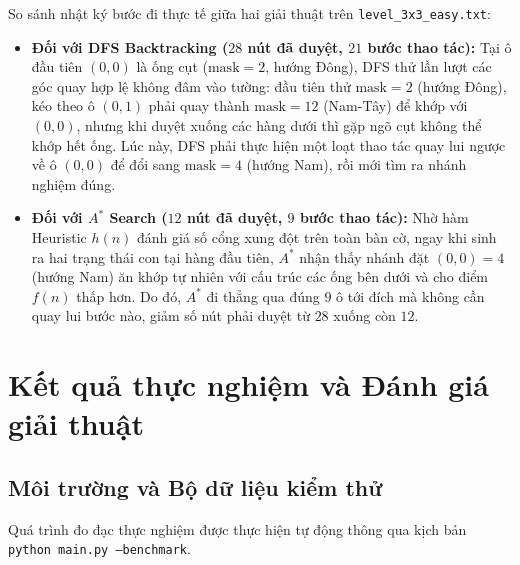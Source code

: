 \documentclass[a4paper]{article}
\begin{document}
So sánh nhật ký bước đi thực tế giữa hai giải thuật trên \texttt{level\_3x3\_easy.txt}:
\begin{itemize}
    \item \textbf{Đối với DFS Backtracking ($28$ nút đã duyệt, $21$ bước thao tác):}
    Tại ô đầu tiên $(0, 0)$ là ống cụt ($\text{mask} = 2$, hướng Đông), DFS thử lần lượt các góc quay hợp lệ không đâm vào tường: đầu tiên thử $\text{mask} = 2$ (hướng Đông), kéo theo ô $(0, 1)$ phải quay thành $\text{mask} = 12$ (Nam-Tây) để khớp với $(0, 0)$, nhưng khi duyệt xuống các hàng dưới thì gặp ngõ cụt không thể khớp hết ống. Lúc này, DFS phải thực hiện một loạt thao tác quay lui ngược về ô $(0, 0)$ để đổi sang $\text{mask} = 4$ (hướng Nam), rồi mới tìm ra nhánh nghiệm đúng.
    \item \textbf{Đối với $A^*$ Search ($12$ nút đã duyệt, $9$ bước thao tác):}
    Nhờ hàm Heuristic $h(n)$ đánh giá số cổng xung đột trên toàn bàn cờ, ngay khi sinh ra hai trạng thái con tại hàng đầu tiên, $A^*$ nhận thấy nhánh đặt $(0, 0) = 4$ (hướng Nam) ăn khớp tự nhiên với cấu trúc các ống bên dưới và cho điểm $f(n)$ thấp hơn. Do đó, $A^*$ đi thẳng qua đúng $9$ ô tới đích mà không cần quay lui bước nào, giảm số nút phải duyệt từ $28$ xuống còn $12$.
\end{itemize}

\newpage

\section{Kết quả thực nghiệm và Đánh giá giải thuật}

\subsection{Môi trường và Bộ dữ liệu kiểm thử}
Quá trình đo đạc thực nghiệm được thực hiện tự động thông qua kịch bản \texttt{python main.py --benchmark}. 
\end{document}

